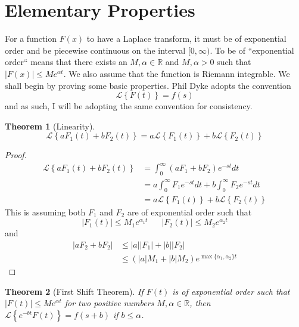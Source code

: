\documentclass{report}
\newtheorem{theorem}{Theorem}[chapter]
\theoremstyle{definition}
\theoremstyle{remark}
\newcommand{\lapt}[1]{\mathscr{L}\left\{ #1\right\}}
\newcommand{\R}{\mathbb{R}}
\newcommand{\twen}{\hspace{20pt}}
\begin{document}
\section{Elementary Properties}
For a function $F(x)$ to have a Laplace transform, it must be of exponential order and be piecewise continuous on the interval $[0,\infty)$. To be of ``exponential order`` means that there exists an $M,\alpha \in \R$ and $M,\alpha >0$ such that $|F(x)| \leq Me^{\alpha t}$. We also assume that the function is Riemann integrable. We shall begin by proving some basic properties. Phil Dyke adopts the convention 
\begin{equation*}
    \lapt{F(t)} = f(s)
\end{equation*}
and as such, I will be adopting the same convention for consistency.
\begin{theorem}[Linearity]
\begin{equation*}
    \lapt{aF_1(t) + bF_2(t)} = a\lapt{F_1(t)} + b\lapt{F_2(t)}
\end{equation*}
\end{theorem}
\begin{proof}
    \begin{equation*}
    \begin{split}
        \lapt{aF_1(t) + bF_2(t)}& = \int^\infty_0 (aF_1+bF_2)e^{-st} dt \\
        &=a\int^\infty_0F_1e^{-st}dt + b\int^\infty_0F_2e^{-st}dt \\
        &= a\lapt{F_1(t)} + b\lapt{F_2(t)}
    \end{split}
    \end{equation*}
    This is assuming both $F_1$ and $F_2$ are of exponential order such that 
    \begin{equation*}
        |F_1(t)| \leq M_1 e^{\alpha_1t} \twen |F_2(t)| \leq M_2e^{\alpha_2t}
    \end{equation*} 
    and \begin{equation*}
        \begin{split}
            |aF_2+bF_2| &\leq |a||F_1| + |b||F_2| \\
            &\leq (|a|M_1+|b|M_2)e^{\max\{ \alpha_1,\alpha_2 \}t}
        \end{split}
    \end{equation*}
\end{proof}
\begin{theorem}[First Shift Theorem]
    If $F(t)$ is of exponential order such that $|F(t)| \leq Me^{\alpha t}$ for two positive numbers $M,\alpha \in \R$, then  $\lapt{e^{-bt}F(t)}=f(s+b)$ if $b\leq \alpha$.\label{theo:fst}
\end{theorem}
\end{document}
